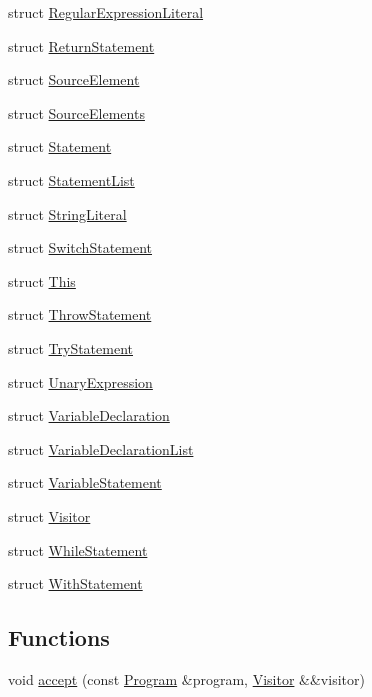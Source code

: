 \begin{DoxyCompactItemize}
\item 
struct \hyperlink{structast_1_1_regular_expression_literal}{Regular\+Expression\+Literal}
\item 
struct \hyperlink{structast_1_1_return_statement}{Return\+Statement}
\item 
struct \hyperlink{structast_1_1_source_element}{Source\+Element}
\item 
struct \hyperlink{structast_1_1_source_elements}{Source\+Elements}
\item 
struct \hyperlink{structast_1_1_statement}{Statement}
\item 
struct \hyperlink{structast_1_1_statement_list}{Statement\+List}
\item 
struct \hyperlink{structast_1_1_string_literal}{String\+Literal}
\item 
struct \hyperlink{structast_1_1_switch_statement}{Switch\+Statement}
\item 
struct \hyperlink{structast_1_1_this}{This}
\item 
struct \hyperlink{structast_1_1_throw_statement}{Throw\+Statement}
\item 
struct \hyperlink{structast_1_1_try_statement}{Try\+Statement}
\item 
struct \hyperlink{structast_1_1_unary_expression}{Unary\+Expression}
\item 
struct \hyperlink{structast_1_1_variable_declaration}{Variable\+Declaration}
\item 
struct \hyperlink{structast_1_1_variable_declaration_list}{Variable\+Declaration\+List}
\item 
struct \hyperlink{structast_1_1_variable_statement}{Variable\+Statement}
\item 
struct \hyperlink{structast_1_1_visitor}{Visitor}
\item 
struct \hyperlink{structast_1_1_while_statement}{While\+Statement}
\item 
struct \hyperlink{structast_1_1_with_statement}{With\+Statement}
\end{DoxyCompactItemize}
\subsection*{Functions}
\begin{DoxyCompactItemize}
\item 
void \hyperlink{namespaceast_ae8ec562ad69aa05004765217ff90879b}{accept} (const \hyperlink{structast_1_1_program}{Program} \&program, \hyperlink{structast_1_1_visitor}{Visitor} \&\&visitor)
\end{DoxyCompactItemize}


